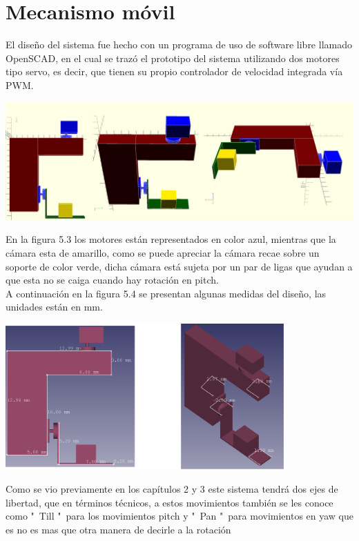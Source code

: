 \section{Mecanismo móvil}
El diseño del sistema fue hecho con un programa de uso de software libre llamado OpenSCAD, en el cual se trazó el prototipo del
sistema utilizando dos motores tipo servo, es decir, que tienen su propio controlador de velocidad integrada vía PWM.
\begin{center}
	\includegraphics[width=1.0\textwidth]{Contenido/Cuerpo/Capitulo5/Fig14.eps}
	\label{Fig1}
\end{center}
En la figura 5.3 los motores están representados en color azul, mientras que la cámara esta de amarillo, como se puede apreciar
la cámara recae sobre un soporte de color verde, dicha cámara está sujeta por un par de ligas que ayudan a que esta no se
caiga cuando hay rotación en pitch.\\
A continuación en la figura 5.4 se presentan algunas medidas del diseño, las unidades están en mm.
\begin{center}
	\includegraphics[width=0.8\textwidth]{Contenido/Cuerpo/Capitulo5/Fig16.eps}
	\label{Fig1}
\end{center}
Como se vio previamente en los capítulos 2 y 3 este sistema tendrá dos ejes de libertad, que en términos técnicos, a estos
movimientos también se les conoce como "\ Till "\ para los movimientos pitch y "\ Pan "\ para movimientos en yaw que es no es mas que otra manera de decirle a la rotación
